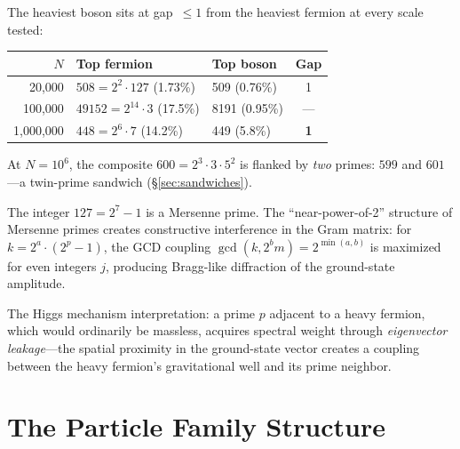 \documentclass[11pt,a4paper]{article}
\begin{document}
\begin{observation}
\label{obs:higgs}
The heaviest boson sits at gap~$\leq 1$ from the heaviest fermion
at every scale tested:
\begin{center}
\begin{tabular}{@{}rllc@{}}
\toprule
$N$ & Top fermion & Top boson & Gap \\
\midrule
20{,}000     & $508 = 2^2 \cdot 127$ (1.73\%) & 509 (0.76\%)  & 1 \\
100{,}000    & $49152 = 2^{14} \cdot 3$ (17.5\%) & 8191 (0.95\%) & --- \\
1{,}000{,}000 & $448 = 2^6 \cdot 7$ (14.2\%)  & 449 (5.8\%)   & \textbf{1} \\
\bottomrule
\end{tabular}
\end{center}
At $N = 10^6$, the composite $600 = 2^3 \cdot 3 \cdot 5^2$ is flanked
by \emph{two} primes: $599$ and $601$---a twin-prime sandwich
(\S\ref{sec:sandwiches}).
\end{observation}

\begin{remark}
The integer $127 = 2^7 - 1$ is a Mersenne prime. The ``near-power-of-2''
structure of Mersenne primes creates constructive interference in the
Gram matrix: for $k = 2^a \cdot (2^p - 1)$, the GCD coupling
$\gcd(k, 2^b m) = 2^{\min(a,b)}$ is maximized for even integers $j$,
producing Bragg-like diffraction of the ground-state amplitude.
\end{remark}

The Higgs mechanism interpretation: a prime $p$ adjacent to a heavy
fermion, which would ordinarily be massless, acquires spectral weight
through \emph{eigenvector leakage}---the spatial proximity
in the ground-state vector creates a coupling between the heavy
fermion's gravitational well and its prime neighbor.

\section{The Particle Family Structure}
\label{sec:families}
\end{document}
